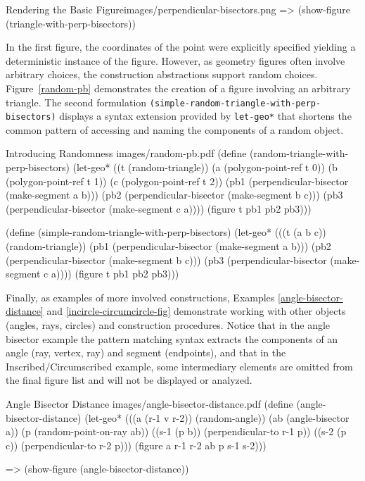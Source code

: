 \begin{img-example}
[label=perp-show-figure]
{Rendering the Basic Figure}{images/perpendicular-bisectors.png}
=> (show-figure (triangle-with-perp-bisectors))
\end{img-example}

In the first figure, the coordinates of the point were explicitly
specified yielding a deterministic instance of the figure. However, as
geometry figures often involve arbitrary choices, the construction
abstractions support random choices. Figure~\ref{random-pb}
demonstrates the creation of a figure involving an arbitrary
triangle. The second formulation
\texttt{(simple-random-triangle-with-perp-bisectors)} displays a
syntax extension provided by \texttt{let-geo*} that shortens the
common pattern of accessing and naming the components of a random
object.

\begin{pdf-example}
[label=random-pb]
{Introducing Randomness}
{images/random-pb.pdf}
(define (random-triangle-with-perp-bisectors)
  (let-geo* ((t (random-triangle))
             (a (polygon-point-ref t 0))
             (b (polygon-point-ref t 1))
             (c (polygon-point-ref t 2))
             (pb1 (perpendicular-bisector (make-segment a b)))
             (pb2 (perpendicular-bisector (make-segment b c)))
             (pb3 (perpendicular-bisector (make-segment c a))))
    (figure t pb1 pb2 pb3)))

(define (simple-random-triangle-with-perp-bisectors)
  (let-geo* (((t (a b c)) (random-triangle))
             (pb1 (perpendicular-bisector (make-segment a b)))
             (pb2 (perpendicular-bisector (make-segment b c)))
             (pb3 (perpendicular-bisector (make-segment c a))))
    (figure t pb1 pb2 pb3)))
\end{pdf-example}

Finally, as examples of more involved constructions, Examples
\ref{angle-bisector-distance} and \ref{incircle-circumcircle-fig}
demonstrate working with other objects (angles, rays, circles) and
construction procedures. Notice that in the angle bisector example
the pattern matching syntax extracts the components of an angle (ray,
vertex, ray) and segment (endpoints), and that in the
Inscribed/Circumscribed example, some intermediary elements are
omitted from the final figure list and will not be displayed or
analyzed.

\begin{pdf-example}
[label=angle-bisector-distance]
{Angle Bisector Distance}
{images/angle-bisector-distance.pdf}
(define (angle-bisector-distance)
  (let-geo* (((a (r-1 v r-2)) (random-angle))
             (ab (angle-bisector a))
             (p (random-point-on-ray ab))
             ((s-1 (p b)) (perpendicular-to r-1 p))
             ((s-2 (p c)) (perpendicular-to r-2 p)))
     (figure a r-1 r-2 ab p s-1 s-2)))

=> (show-figure (angle-bisector-distance))
\end{pdf-example}

